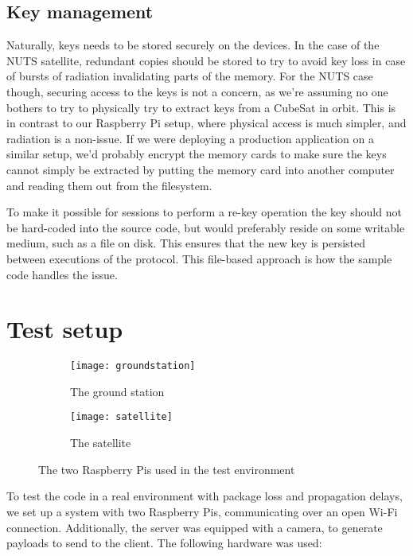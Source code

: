     \subsection{Key management}

Naturally, keys needs to be stored securely on the devices. In the case of the NUTS satellite, redundant copies should be stored to try to avoid key loss in case of bursts of radiation invalidating parts of the memory. For the NUTS case though, securing access to the keys is not a concern, as we're assuming no one bothers to try to physically try to extract keys from a CubeSat in orbit. This is in contrast to our Raspberry Pi setup, where physical access is much simpler, and radiation is a non-issue. If we were deploying a production application on a similar setup, we'd probably encrypt the memory cards to make sure the keys cannot simply be extracted by putting the memory card into another computer and reading them out from the filesystem.

To make it possible for sessions to perform a re-key operation the key should not be hard-coded into the source code, but would preferably reside on some writable medium, such as a file on disk. This ensures that the new key is persisted between executions of the protocol. This file-based approach is how the sample code handles the issue.


\section{Test setup}\label{sec:test_setup}

\begin{figure}[ht!]
\centering
    \begin{subfigure}{.5\textwidth}
        \centering
        \texttt{[image: groundstation]}
        \caption{The ground station}\label{fig:ground-station}
    \end{subfigure}%
    \begin{subfigure}{.5\textwidth}
        \centering
        \texttt{[image: satellite]}
        \caption{The satellite}\label{fig:satellite}
    \end{subfigure}
    \caption{The two Raspberry Pis used in the test environment}\label{fig:raspberrys}
\end{figure}

To test the code in a real environment with package loss and propagation delays, we set up a system with two Raspberry Pis, communicating over an open Wi-Fi connection. Additionally, the server was equipped with a camera, to generate payloads to send to the client. The following hardware was used:

